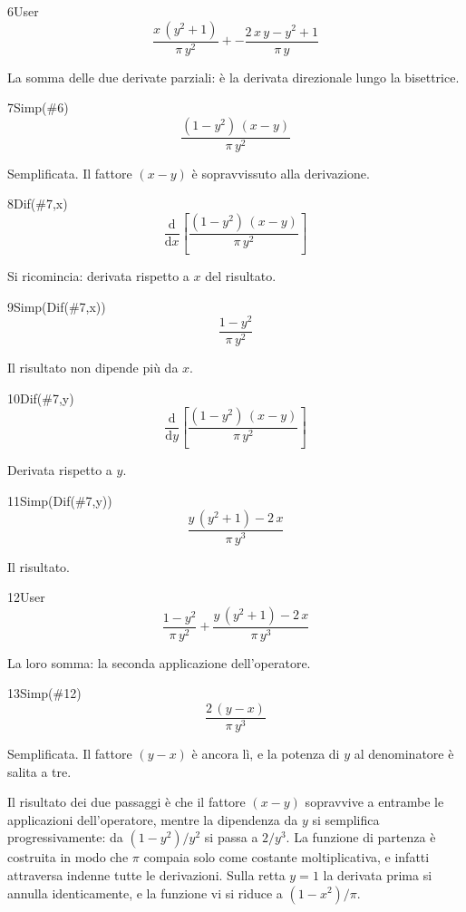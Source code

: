 \begin{espr}{6}{User}{}
\[
\frac{x\, \left(y^{2} + 1\right)}{\pi\, y^{2}} + -\frac{2\, x\, y - y^{2} + 1}{\pi\, y}
\]
\end{espr}
La somma delle due derivate parziali: è la derivata direzionale lungo la bisettrice.

\begin{espr}{7}{Simp(\#6)}{}
\[
\frac{\left(1 - y^{2}\right)\, \left(x - y\right)}{\pi\, y^{2}}
\]
\end{espr}
Semplificata. Il fattore $(x-y)$ è sopravvissuto alla derivazione.

\begin{espr}{8}{Dif(\#7,x)}{}
\[
\frac{\mathrm{d}}{\mathrm{d}x}\!\left[\frac{\left(1 - y^{2}\right)\, \left(x - y\right)}{\pi\, y^{2}}\right]
\]
\end{espr}
Si ricomincia: derivata rispetto a $x$ del risultato.

\begin{espr}{9}{Simp(Dif(\#7,x))}{}
\[
\frac{1 - y^{2}}{\pi\, y^{2}}
\]
\end{espr}
Il risultato non dipende più da $x$.

\begin{espr}{10}{Dif(\#7,y)}{}
\[
\frac{\mathrm{d}}{\mathrm{d}y}\!\left[\frac{\left(1 - y^{2}\right)\, \left(x - y\right)}{\pi\, y^{2}}\right]
\]
\end{espr}
Derivata rispetto a $y$.

\begin{espr}{11}{Simp(Dif(\#7,y))}{}
\[
\frac{y\, \left(y^{2} + 1\right) - 2\, x}{\pi\, y^{3}}
\]
\end{espr}
Il risultato.

\begin{espr}{12}{User}{}
\[
\frac{1 - y^{2}}{\pi\, y^{2}} + \frac{y\, \left(y^{2} + 1\right) - 2\, x}{\pi\, y^{3}}
\]
\end{espr}
La loro somma: la seconda applicazione dell'operatore.

\begin{espr}{13}{Simp(\#12)}{}
\[
\frac{2\, \left(y - x\right)}{\pi\, y^{3}}
\]
\end{espr}
Semplificata. Il fattore $(y-x)$ è ancora lì, e la potenza di $y$ al denominatore è salita a tre.


Il risultato dei due passaggi è che il fattore $(x-y)$ sopravvive a entrambe le applicazioni dell'operatore, mentre la dipendenza da $y$ si semplifica progressivamente: da $(1-y^2)/y^2$ si passa a $2/y^3$. La funzione di partenza è costruita in modo che $\pi$ compaia solo come costante moltiplicativa, e infatti attraversa indenne tutte le derivazioni. Sulla retta $y=1$ la derivata prima si annulla identicamente, e la funzione vi si riduce a $(1-x^2)/\pi$.


